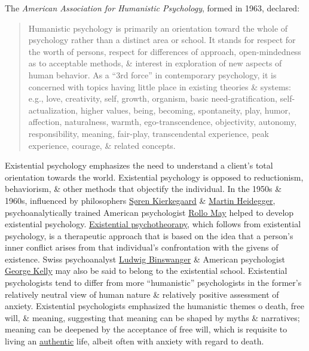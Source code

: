 \documentclass[oneside]{book}
\numberwithin{equation}{section}
\begin{document}
The \textit{American Association for Humanistic Psychology}, formed in 1963, declared:
\begin{quotation}
	Humanistic psychology is primarily an orientation toward the whole of psychology rather than a distinct area or school. It stands for respect for the worth of persons, respect for differences of approach, open-mindedness as to acceptable methods, \& interest in exploration of new aspects of human behavior. As a ``3rd force'' in contemporary psychology, it is concerned with topics having little place in existing theories \& systems: e.g., love, creativity, self, growth, organism, basic need-gratification, self-actualization, higher values, being, becoming, spontaneity, play, humor, affection, naturalness, warmth, ego-transcendence, objectivity, autonomy, responsibility, meaning, fair-play, transcendental experience, peak experience, courage, \& related concepts.
\end{quotation}
Existential psychology emphasizes the need to understand a client's total orientation towards the world. Existential psychology is opposed to reductionism, behaviorism, \& other methods that objectify the individual. In the 1950s \& 1960s, influenced by philosophers \href{https://en.wikipedia.org/wiki/S%C3%B8ren_Kierkegaard}{S\o ren Kierkegaard} \& \href{https://en.wikipedia.org/wiki/Martin_Heidegger}{Martin Heidegger}, psychoanalytically trained American psychologist \href{https://en.wikipedia.org/wiki/Rollo_May}{Rollo May} helped to develop existential psychology. \href{https://en.wikipedia.org/wiki/Existential_therapy}{Existential psychotheorapy}, which follows from existential psychology, is a therapeutic approach that is based on the idea that a person's inner conflict arises from that individual's confrontation with the givens of existence. Swiss psychoanalyst \href{https://en.wikipedia.org/wiki/Ludwig_Binswanger}{Ludwig Binswanger} \& American psychologist \href{https://en.wikipedia.org/wiki/George_Kelly_(psychologist)}{George Kelly} may also be said to belong to the existential school. Existential psychologists tend to differ from more ``humanistic'' psychologists in the former's relatively neutral view of human nature \& relatively positive assessment of anxiety. Existential psychologists emphasized the humanistic themes o death, free will, \& meaning, suggesting that meaning can be shaped by myths \& narratives; meaning can be deepened by the acceptance of free will, which is requisite to living an \href{https://en.wikipedia.org/wiki/Authenticity_(philosophy)}{authentic} life, albeit often with anxiety with regard to death.
\end{document}
